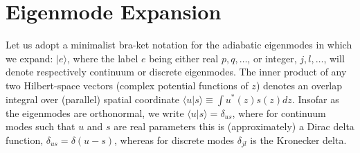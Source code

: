 \documentclass[12pt]{article}
\def\ket#1{|#1\rangle}
\def\bra#1{\langle#1}
\begin{document}
\section{Eigenmode Expansion}
Let us adopt a minimalist bra-ket notation for the adiabatic
eigenmodes in which we expand: $\ket{e}$, where the label $e$ being
either real $p,q,\dots$, or integer, $j,l,\dots$, will denote
respectively continuum or discrete eigenmodes. The inner product of
any two Hilbert-space vectors (complex potential functions of $z$)
denotes an overlap integral over (parallel) spatial coordinate
$\bra{u}\ket{s}\equiv \int u^*(z)s(z)dz$. Insofar as the eigenmodes
are orthonormal, we write $\bra{u}\ket{s}=\delta_{us}$, where for
continuum modes such that $u$ and $s$ are real parameters this is
(approximately) a Dirac delta function, $\delta_{us}=\delta(u-s)$,
whereas for discrete modes $\delta_{jl}$ is the Kronecker delta.
\end{document}
